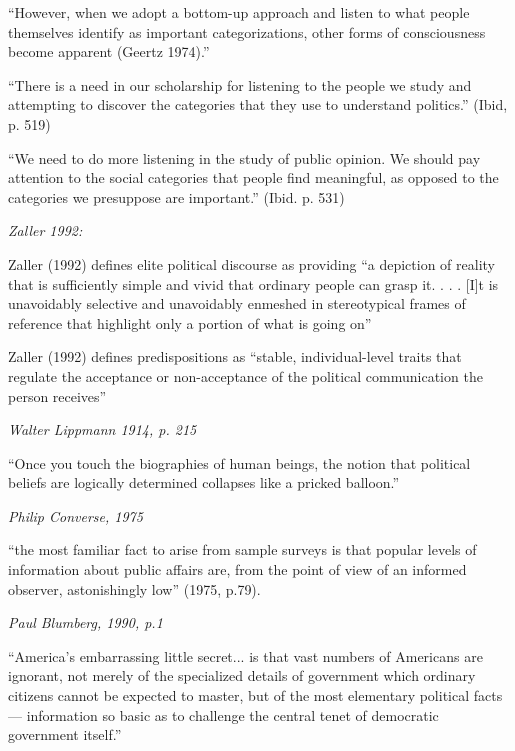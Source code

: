 \documentclass[12pt]{article}
\begin{document}
``However, when we adopt a bottom-up approach and listen to what people themselves identify as important categorizations, other forms of consciousness become apparent (Geertz 1974).''

\hfill 

``There is a need in our scholarship for listening to the people we study and attempting to discover the categories that they use to understand politics.'' (Ibid, p. 519)

\hfill 

``We need to do more listening in the study of public opinion. We should pay attention to the social categories that people find meaningful, as opposed to the categories we presuppose are important.'' (Ibid. p. 531)

\hfill 

\textit{Zaller 1992:}

Zaller (1992) defines elite political discourse as providing ``a depiction of reality that is sufficiently simple and vivid that ordinary people can grasp it. . . . [I]t is unavoidably selective and unavoidably enmeshed in stereotypical frames of reference that highlight only a portion of what is going on''

\hfill 

Zaller (1992) defines predispositions as ``stable, individual-level traits that regulate the acceptance or non-acceptance of the political communication the person receives''

\hfill

\textit{Walter Lippmann 1914, p. 215}

``Once you touch the biographies of human beings, the notion that political beliefs are logically determined collapses like a pricked balloon.'' 

\hfill 


\textit{Philip Converse, 1975}

``the most familiar fact to arise from sample surveys is that popular levels of information about public affairs are, from the point of view of an informed observer, astonishingly low'' (1975, p.79).  

\hfill 

\textit{Paul Blumberg, 1990, p.1}

``America's embarrassing little secret... is that vast numbers of Americans are ignorant, not merely of the specialized details of government which ordinary citizens cannot be expected to master, but of the most elementary political facts --- information so basic as to challenge the central tenet of democratic government itself.''  
\end{document}
